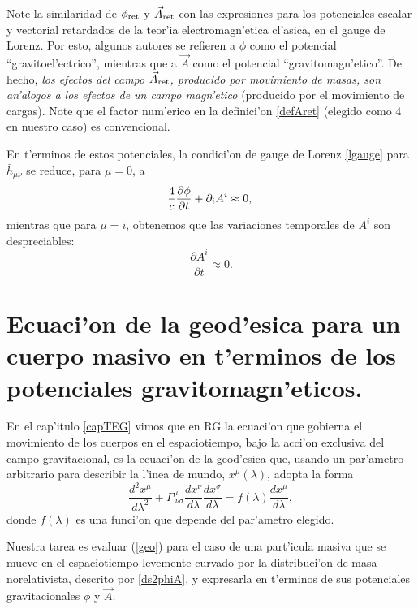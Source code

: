 Note la similaridad de $\phi_{\rm ret}$ y $\vec{A}_{\rm ret}$ con las expresiones para los potenciales escalar y vectorial retardados de la teor'ia electromagn'etica cl'asica, en el gauge de Lorenz. Por esto, algunos autores se refieren a $\phi$ como el potencial  ``gravitoel'ectrico'', mientras que a $\vec{A}$ como el potencial ``gravitomagn'etico''. De hecho, \textit{los efectos del campo $\vec{A}_{\rm ret}$, producido por movimiento de masas, son an'alogos a los efectos de un campo magn'etico} (producido por el movimiento de cargas). Note que el factor num'erico en la definici'on \eqref{defAret} (elegido como $4$ en nuestro caso) es convencional.

En t'erminos de estos potenciales, la condici'on de gauge de Lorenz \eqref{lgauge} para $\bar{h}_{\mu\nu}$ se reduce, para $\mu=0$, a
\begin{equation}
\frac{4}{c}\frac{\partial \phi}{\partial t}+\partial_i A^i\approx 0,\label{gaugelorenz0}\\
\end{equation}
mientras que para $\mu=i$, obtenemos que las variaciones temporales de $A^i$ son despreciables:
\begin{equation}
\frac{\partial A^i}{\partial t}\approx 0.\label{a0}
\end{equation}

\section{Ecuaci'on de la geod'esica para un cuerpo masivo en t'erminos de los potenciales gravitomagn'eticos.}

En el cap'itulo \ref{capTEG} vimos que en RG la ecuaci'on que gobierna el movimiento de los cuerpos en el espaciotiempo, bajo la acci'on exclusiva del campo gravitacional, es la ecuaci'on de la geod'esica que, usando un par'ametro arbitrario para describir la l'inea de mundo, $x^\mu(\lambda)$, adopta la forma
\begin{equation}
\frac{d^2x^\mu }{d\lambda^2}+\Gamma^\mu _{\ \nu\sigma}\frac{dx^{\nu}}{d\lambda}\frac{dx^{\sigma}}{d\lambda}=f(\lambda)\frac{dx^\mu }{d\lambda},\label{geo}
\end{equation}
donde $f(\lambda)$ es una funci'on que depende del par'ametro elegido.

Nuestra tarea es evaluar (\ref{geo}) para el caso de una part'icula masiva que se mueve en el espaciotiempo levemente curvado por la distribuci'on de masa norelativista, descrito por \eqref{ds2phiA}, y expresarla en t'erminos de sus potenciales gravitacionales $\phi$ y $\vec{A}$.

